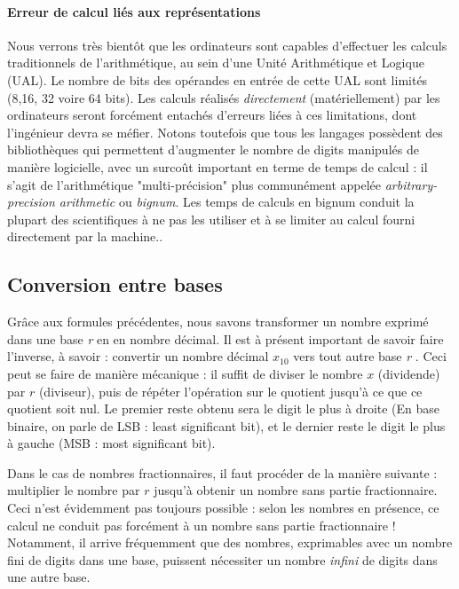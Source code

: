 \paragraph{Erreur de calcul liés aux représentations}
Nous verrons très bientôt que les ordinateurs sont capables d'effectuer les calculs traditionnels de l'arithmétique, au sein d'une Unité Arithmétique et Logique (UAL).
Le nombre de bits des opérandes en entrée de cette UAL sont limités (8,16, 32 voire 64 bits). Les calculs réalisés {\it directement} (matériellement) par les ordinateurs seront
forcément entachés d'erreurs liées à ces limitations, dont l'ingénieur devra se méfier. Notons toutefois que tous les langages possèdent des bibliothèques qui permettent
d'augmenter le nombre de digits manipulés de manière logicielle, avec un surcoût important en terme de temps de calcul :
il s'agit de l'arithmétique "multi-précision" plus communément appelée {\it arbitrary-precision arithmetic} ou {\it bignum}.
Les temps de
calculs en bignum conduit la plupart des scientifiques à ne pas les utiliser et à se limiter au calcul fourni directement par la machine..

\subsection{Conversion entre bases}
Grâce aux formules précédentes, nous savons transformer un nombre exprimé dans une base {\it r} en en nombre décimal.
Il est à présent important de savoir faire l'inverse, à savoir : convertir un nombre décimal $x_{10}$ vers tout autre base {\it r} .
Ceci peut se faire de manière mécanique : il suffit de diviser le nombre $x$ (dividende) par $r$ (diviseur), puis de répéter
l'opération sur le quotient jusqu'à ce que ce quotient soit nul. Le premier reste obtenu sera le digit
le plus à droite (En base  binaire, on parle de LSB : least significant bit), et le dernier reste  le digit le plus à gauche
(MSB : most significant bit).

Dans le cas de nombres fractionnaires, il faut procéder de la manière suivante : multiplier le nombre par $r$ jusqu'à obtenir
un nombre sans partie fractionnaire. Ceci n'est évidemment pas toujours possible : selon les nombres en présence, ce calcul ne conduit pas
forcément à un nombre sans partie fractionnaire ! Notamment, il arrive fréquemment que des nombres, exprimables avec un nombre fini de digits dans une base,
puissent nécessiter un nombre {\it infini} de digits dans une autre base.

